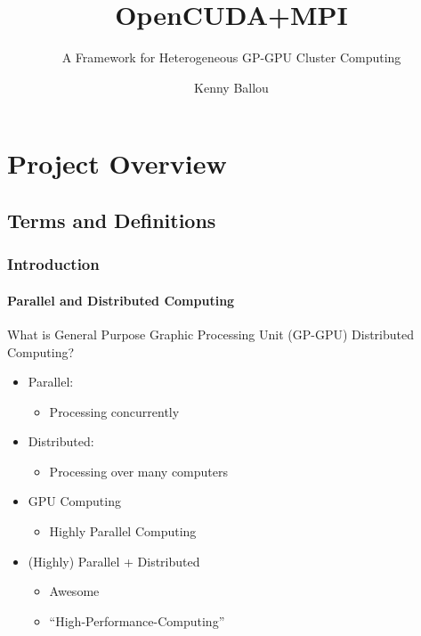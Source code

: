 \documentclass{beamer}
\title{OpenCUDA+MPI}
\subtitle{A Framework for Heterogeneous GP-GPU Cluster Computing}
\author[Ballou]{Kenny Ballou}
\begin{document}
\begin{frame}[label=titleslide]
\titlepage{}
\end{frame}
\begin{frame}
\tableofcontents[subsectionstyle=hide]
\end{frame}
\section{Project Overview}
\subsection{Terms and Definitions}
\begin{frame}
\frametitle{Introduction}
\framesubtitle{Parallel and Distributed Computing}
What is General Purpose Graphic Processing Unit (GP-GPU) Distributed Computing?
\begin{itemize}
\item{Parallel:}
\begin{itemize}
\item{Processing concurrently}
\end{itemize}
\item{Distributed:}
\begin{itemize}
\item{Processing over many computers}
\end{itemize}
\item{GPU Computing}
\begin{itemize}
\item{Highly Parallel Computing}
\end{itemize}
\item{(Highly) Parallel + Distributed}
\begin{itemize}
\item{Awesome}
\item{``High-Performance-Computing''}
\end{itemize}
\end{itemize}
\end{frame}
\end{document}
